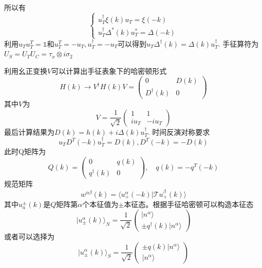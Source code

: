 \documentclass{article}
\numberwithin{equation}{subsection}
\begin{document}
所以有
\begin{equation}
    \begin{cases}
        u_T^\dagger\xi(k)u_T=\xi(-k)\\
        u_T^\dagger\Delta^*(k)u_T^*=\Delta(-k)
    \end{cases}
\end{equation}
利用$u_Tu_T^T=\mathbb{1}$和$u_T^T=-u_T,u_T^\dagger=-u_T$可以得到$u_T\Delta^\dagger(k)=\Delta(k)u_T^\dagger$. 手征算符为$U_S=U_TU_C=\tau_x\otimes i\sigma_2$

利用幺正变换$V$可以计算出手征表象下的哈密顿形式
\begin{equation}
    H(k)\rightarrow V^\dagger H(k)V=\begin{pmatrix}
        0&D(k)\\
        D^\dagger(k)&0
    \end{pmatrix}
\end{equation}
其中$V$为
\begin{equation}
    V=\frac{1}{\sqrt{2}}\begin{pmatrix}
        1&1\\
        iu_T&-iu_T
    \end{pmatrix}
\end{equation}
最后计算结果为$D(k)=h(k)+i\Delta(k)u_T^\dagger$. 时间反演对称要求
\begin{equation}
    u_T D^T(-k)u_T^\dagger=D(k),D^T(-k)=-D(k)
\end{equation}
此时Q矩阵为
\begin{equation}
    Q(k)=\begin{pmatrix}
        0&q(k)\\
        q^\dagger(k)&0
    \end{pmatrix},\quad q(k)=-q^T(-k)
\end{equation}
规范矩阵
\begin{equation}
    w^{\alpha\beta}(k)=\langle u^\alpha_+(-k)|\mathcal{T}u^\beta_+(k)\rangle
\end{equation}
其中$u_a^\pm(k)$是$Q$矩阵第$\alpha$个本征值为$\pm$本征态。根据手征哈密顿可以构造本征态
\begin{equation}
    |u^\alpha_\pm(k)\rangle_N=\frac{1}{\sqrt{2}}\begin{pmatrix}
        |n^\alpha\rangle\\
        \pm q^\dagger(k)|n^\alpha\rangle
    \end{pmatrix}
\end{equation}
或者可以选择为
\begin{equation}
    |u^\alpha_\pm(k)\rangle_S=\frac{1}{\sqrt{2}}\begin{pmatrix}
        \pm q(k)|n^\alpha\rangle\\
        |n^\alpha\rangle
    \end{pmatrix}
\end{equation}
\end{document}
